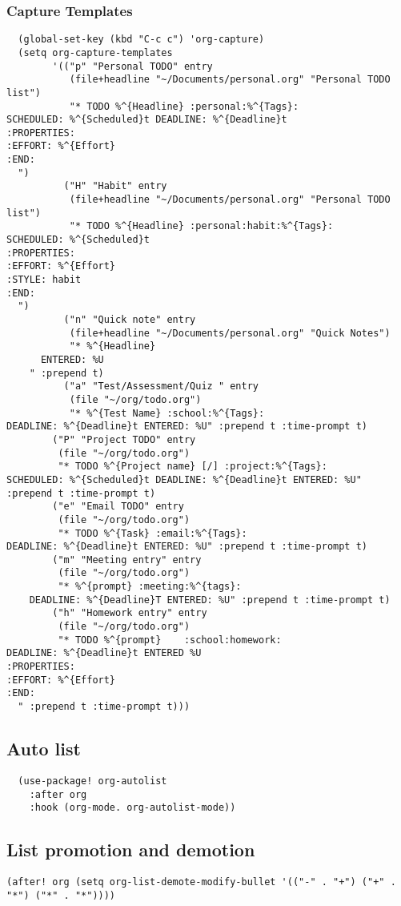 \documentclass[11pt]{article}
\begin{document}
\subsubsection{Capture Templates}
\label{sec:org6b90d90}
\begin{verbatim}
  (global-set-key (kbd "C-c c") 'org-capture)
  (setq org-capture-templates
        '(("p" "Personal TODO" entry
           (file+headline "~/Documents/personal.org" "Personal TODO list")
           "* TODO %^{Headline} :personal:%^{Tags}:
SCHEDULED: %^{Scheduled}t DEADLINE: %^{Deadline}t
:PROPERTIES:
:EFFORT: %^{Effort}
:END:
  ")
          ("H" "Habit" entry
           (file+headline "~/Documents/personal.org" "Personal TODO list")
           "* TODO %^{Headline} :personal:habit:%^{Tags}:
SCHEDULED: %^{Scheduled}t
:PROPERTIES:
:EFFORT: %^{Effort}
:STYLE: habit
:END:
  ")
          ("n" "Quick note" entry
           (file+headline "~/Documents/personal.org" "Quick Notes")
           "* %^{Headline}
      ENTERED: %U
    " :prepend t)
          ("a" "Test/Assessment/Quiz " entry
           (file "~/org/todo.org")
           "* %^{Test Name} :school:%^{Tags}:
DEADLINE: %^{Deadline}t ENTERED: %U" :prepend t :time-prompt t)
        ("P" "Project TODO" entry
         (file "~/org/todo.org")
         "* TODO %^{Project name} [/] :project:%^{Tags}:
SCHEDULED: %^{Scheduled}t DEADLINE: %^{Deadline}t ENTERED: %U" :prepend t :time-prompt t)
        ("e" "Email TODO" entry
         (file "~/org/todo.org")
         "* TODO %^{Task} :email:%^{Tags}:
DEADLINE: %^{Deadline}t ENTERED: %U" :prepend t :time-prompt t)
        ("m" "Meeting entry" entry
         (file "~/org/todo.org")
         "* %^{prompt} :meeting:%^{tags}:
    DEADLINE: %^{Deadline}T ENTERED: %U" :prepend t :time-prompt t)
        ("h" "Homework entry" entry
         (file "~/org/todo.org")
         "* TODO %^{prompt}    :school:homework:
DEADLINE: %^{Deadline}t ENTERED %U
:PROPERTIES:
:EFFORT: %^{Effort}
:END:
  " :prepend t :time-prompt t)))
\end{verbatim}
\subsection{Auto list}
\label{sec:orgbab64a6}
\begin{verbatim}
  (use-package! org-autolist
    :after org
    :hook (org-mode. org-autolist-mode))
\end{verbatim}

\subsection{List promotion and demotion}
\label{sec:org1508759}
\begin{verbatim}
(after! org (setq org-list-demote-modify-bullet '(("-" . "+") ("+" . "*") ("*" . "*"))))
\end{verbatim}
\end{document}
